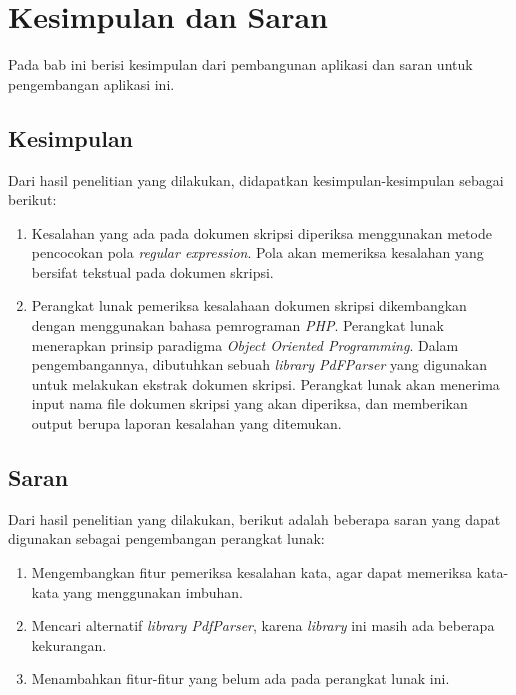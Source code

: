 \chapter{Kesimpulan dan Saran}
\label{chap:kesimpulan_dan_saran}

Pada bab ini berisi kesimpulan dari pembangunan aplikasi dan saran untuk pengembangan aplikasi ini.

\section{Kesimpulan}
\label{sec:kesimpulan}

Dari hasil penelitian yang dilakukan, didapatkan kesimpulan-kesimpulan sebagai berikut:

\begin{enumerate}
	\item Kesalahan yang ada pada dokumen skripsi diperiksa menggunakan metode pencocokan pola \textit{regular expression}. Pola akan memeriksa kesalahan yang bersifat tekstual pada dokumen skripsi. 
	
	\item Perangkat lunak pemeriksa kesalahaan dokumen skripsi dikembangkan dengan menggunakan bahasa pemrograman \textit{PHP}. Perangkat lunak menerapkan prinsip paradigma \textit{Object Oriented Programming}. Dalam pengembangannya, dibutuhkan sebuah \textit{library PdFParser} yang digunakan untuk melakukan ekstrak dokumen skripsi. Perangkat lunak akan menerima input nama file dokumen skripsi yang akan diperiksa, dan memberikan output berupa laporan kesalahan yang ditemukan.
\end{enumerate}

\section{Saran}
\label{sec:saran}
Dari hasil penelitian yang dilakukan, berikut adalah beberapa saran yang dapat digunakan sebagai pengembangan perangkat lunak:

\begin{enumerate}
	\item Mengembangkan fitur pemeriksa kesalahan kata, agar dapat memeriksa kata-kata yang menggunakan imbuhan.
	
	\item Mencari alternatif \textit{library PdfParser}, karena \textit{library} ini masih ada beberapa kekurangan.
	
	\item Menambahkan fitur-fitur yang belum ada pada perangkat lunak ini.
\end{enumerate}